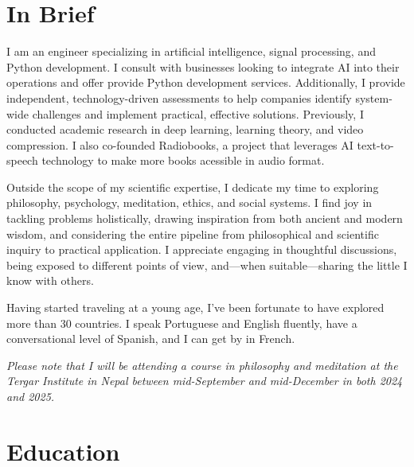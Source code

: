 \documentclass[a4paper,11pt]{article}
\newcommand{\sectionBioNonTech}{
      Outside the scope of my scientific expertise, I dedicate my time to exploring philosophy, psychology, meditation, ethics, and social systems. I find joy in tackling problems holistically, drawing inspiration from both ancient and modern wisdom, and considering the entire pipeline from philosophical and scientific inquiry to practical application. I appreciate engaging in thoughtful discussions, being exposed to different points of view, and—when suitable—sharing the little I know with others.

      Having started traveling at a young age, I've been fortunate to have explored more than 30 countries. I speak Portuguese and English fluently, have a conversational level of Spanish, and I can get by in French.
    }
\newcommand{\sectionBioNonTech}{
      \vspace{10pt}
      Highlights: \\[-20pt]
      \begin{itemize}[topsep=0pt, partopsep=0pt, parsep=0pt, itemsep=0pt, leftmargin=*]
        \item Published \href{https://www.joaquimcampos.com/pubs.html}{seven papers} with over 400 citations in top-tier venues, and holds three patents.
        \item Contributed to the development of \href{https://www.joaquimcampos.com/compression.html}{pioneering methods} in neural compression.
        \item Designed \href{https://www.joaquimcampos.com/deepsplines.html}{novel algorithms} for
        learning the activation functions of a neural network.
        \item Created the \href{https://pypi.org/project/deepsplines/}{"Deep Splines"} PyTorch package.
        \item Co-Founded \href{https://radiobooks.webflow.io/}{Radiobooks}—a startup powered by AI text-to-speech technology.
        \item Built the \href{https://github.com/joaquimcampos/radiobooks-sample}{back-end} of a complex text-to-speech app.
      \end{itemize}
    }
\begin{document}

  \vspace{15pt}

  \section{In Brief}
    I am an engineer specializing in artificial intelligence, signal processing, and Python development. I consult with businesses looking to integrate AI into their operations and offer provide Python development services. Additionally, I provide independent, technology-driven assessments to help companies identify system-wide challenges and implement practical, effective solutions. Previously, I conducted academic research in deep learning, learning theory, and video compression. I also co-founded Radiobooks, a project that leverages AI text-to-speech technology to make more books acessible in audio format.


    \sectionBioNonTech

    \vspace{4pt}

    \emph{Please note that I will be attending a course in philosophy and meditation at the Tergar Institute in Nepal between mid-September and mid-December in both 2024 and 2025.
    }

  \vspace{15pt}

  \section{Education}
\end{document}
